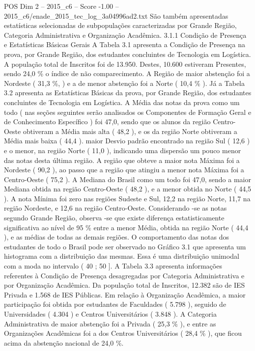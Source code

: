 \begin{textsample}{POS Dim 2 – 2015\_c6 – Score -1.00 – 2015\_c6/enade\_2015\_tec\_log\_3a04996ad2.txt}
São também apresentadas estatísticas selecionadas de subpopulações caracterizadas por Grande Região, Categoria Administrativa e Organização Acadêmica. 3.1.1 Condição de Presença e Estatísticas Básicas Gerais A Tabela 3.1 apresenta a Condição de Presença na prova, por Grande Região, dos estudantes concluintes de Tecnologia em Logística.
A população total de Inscritos foi de 13.950.
Destes, 10.600 estiveram Presentes, sendo 24,0 \% o índice de não comparecimento.
A Região de maior abstenção foi a Nordeste ( 31,3 \%, ) e a de menor abstenção foi a Norte ( 10,4 \% ).
Já a Tabela 3.2 apresenta as Estatísticas Básicas da prova, por Grande Região, dos estudantes concluintes de Tecnologia em Logística.
A Média das notas da prova como um todo ( nas seções seguintes serão analisados os Componentes de Formação Geral e de Conhecimento Específico ) foi 47,0, sendo que os alunos da região Centro-Oeste obtiveram a Média mais alta ( 48,2 ), e os da região Norte obtiveram a Média mais baixa ( 44,4 ). maior Desvio padrão encontrado na região Sul ( 12,6 ) e o menor, na região Norte ( 11,0 ), indicando uma dispersão um pouco menor das notas desta última região.
A região que obteve a maior nota Máxima foi a Nordeste ( 90,2 ), ao passo que a região que atingiu a menor nota Máxima foi a Centro-Oeste ( 75,2 ).
A Mediana do Brasil como um todo foi 47,0, sendo a maior Mediana obtida na região Centro-Oeste ( 48,2 ), e a menor obtida no Norte ( 44,5 ).
A nota Mínima foi zero nas regiões Sudeste e Sul, 12,2 na região Norte, 11,7 na região Nordeste, e 12,6 na região Centro-Oeste.
Considerando -se as notas segundo Grande Região, observa -se que existe diferença estatisticamente significativa ao nível de 95 \% entre a menor Média, obtida na região Norte ( 44,4 ), e as médias de todas as demais regiões.
O comportamento das notas dos estudantes de todo o Brasil pode ser observado no Gráfico 3.1 que apresenta um histograma com a distribuição das mesmas.
Essa é uma distribuição unimodal com a moda no intervalo ( 40 ; 50 ].
A Tabela 3.3 apresenta informações referentes à Condição de Presença desagregadas por Categoria Administrativa e por Organização Acadêmica.
Da população total de Inscritos, 12.382 são de IES Privada e 1.568 de IES Públicas.
Em relação à Organização Acadêmica, a maior participação foi obtida por estudantes de Faculdades ( 5.798 ), seguido de Universidades ( 4.304 ) e Centros Universitários ( 3.848 ).
A Categoria Administrativa de maior abstenção foi a Privada ( 25,3 \% ), e entre as Organizações Acadêmicas foi a dos Centros Universitários ( 28,4 \% ), que ficou acima da abstenção nacional de 24,0 \%.

\end{textsample}
